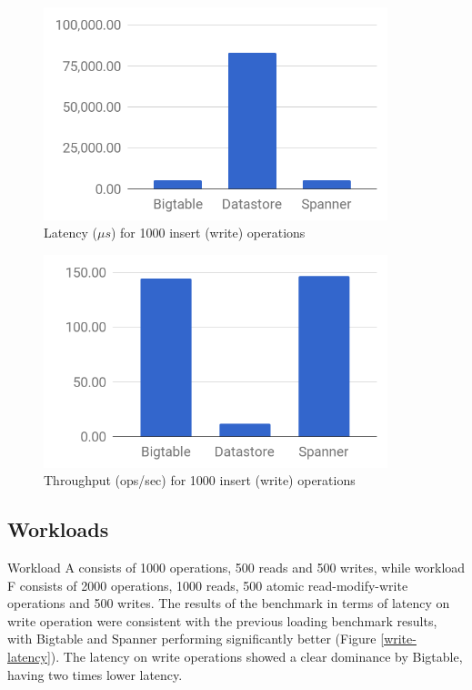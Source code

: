 \documentclass[bsc,frontabs,twoside,singlespacing,parskip,deptreport]{infthesis}     %
\begin{document}

\begin{figure}[h]
	\centering
	\includegraphics[width=10cm]{load-latency}
	\caption{Latency (\( \mu s\)) for 1000 insert (write) operations}
	\label{load-latency}
\end{figure}
\begin{figure}[h]
	\centering
	\includegraphics[width=10cm]{load-throughput}
	\caption{Throughput (ops/sec) for 1000 insert (write) operations}
	\label{load-throughput}
\end{figure}

\subsection{Workloads}

Workload A consists of 1000 operations, 500 reads and 500 writes, while workload F consists of 2000 operations, 1000 reads, 500 atomic read-modify-write operations and 500 writes. The results of the benchmark in terms of latency on write operation were consistent with the previous loading benchmark results, with Bigtable and Spanner performing significantly better (Figure \ref{write-latency}). The latency on write operations showed a clear dominance by Bigtable, having two times lower latency. 
\end{document}
